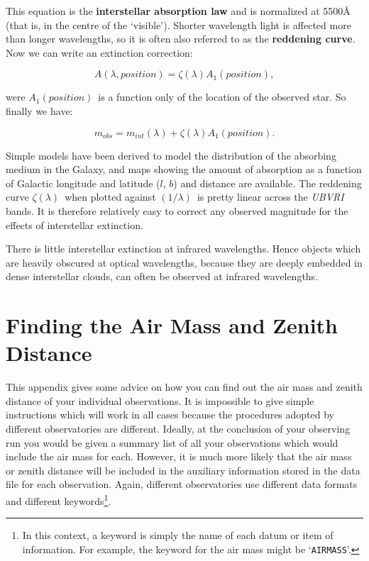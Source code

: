 \documentclass[twoside,11pt]{article}
\newcommand{\xlabel}[1]{}
\begin{document}
This equation is the {\bf interstellar absorption law} and is normalized at
5500\AA~ (that is, in the centre of the `visible').  Shorter wavelength
light is affected more than longer wavelengths, so it is often also
referred to as the {\bf reddening curve}. Now we can write an extinction
correction:

\begin{equation}
A(\lambda,position) = \zeta (\lambda) A_1(position)  ,
\end{equation}

were $A_1(position)$\, is a function only of the location of the
observed star.  So finally we have:

\begin{equation}
m_{obs} = m_{int}(\lambda) + \zeta (\lambda)A_1(position). 
\end{equation}

Simple models\cite{JASCHEK87} have been derived to model the
distribution of the absorbing medium in the Galaxy, and 
maps\cite{NECKEL66, NECKEL80} showing the amount of absorption as a
function of Galactic longitude and latitude ($l$, $b$) and distance
are available.  The reddening curve $\zeta(\lambda)$\, when plotted
against $(1/\lambda)$\, is pretty linear across the {\it UBVRI}\,
bands\cite{SCHILD77}. It is therefore relatively easy to correct any
observed magnitude for the effects of interstellar extinction.

There is little interstellar extinction at infrared wavelengths.  Hence
objects which are heavily obscured at optical wavelengths, because they
are deeply embedded in dense interstellar clouds, can often be observed
at infrared wavelengths.


\newpage
\section{\xlabel{FINDAIRM}\label{FINDAIRM}Finding the Air Mass and
Zenith Distance}

This appendix gives some advice on how you can find out the air mass
and zenith distance of your individual observations.  It is impossible
to give simple instructions which will work in all cases because the
procedures adopted by different observatories are different.  Ideally,
at the conclusion of your observing run you would be given a summary
list of all your observations which would include the air mass for
each.  However, it is much more likely that the air mass or zenith
distance will be included in the auxiliary information stored in the
data file for each observation.  Again, different observatories use
different data formats and different keywords\footnote{In this context,
a keyword is simply the name of each datum or item of information.  For
example, the keyword for the air mass might be `{\tt AIRMASS}'.}.
\end{document}
